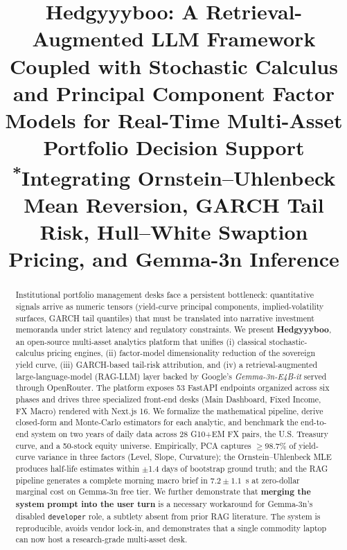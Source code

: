 \documentclass[conference]{IEEEtran}
\begin{document}
\title{Hedgyyyboo: A Retrieval-Augmented LLM Framework Coupled with Stochastic Calculus and Principal Component Factor Models for Real-Time Multi-Asset Portfolio Decision Support\\
{\footnotesize \textsuperscript{*}Integrating Ornstein--Uhlenbeck Mean Reversion, GARCH Tail Risk, Hull--White Swaption Pricing, and Gemma-3n Inference}
}

\author{
}

\maketitle

\begin{abstract}
Institutional portfolio management desks face a persistent bottleneck: quantitative signals arrive as numeric tensors (yield-curve principal components, implied-volatility surfaces, GARCH tail quantiles) that must be translated into narrative investment memoranda under strict latency and regulatory constraints. We present \textbf{Hedgyyyboo}, an open-source multi-asset analytics platform that unifies (i) classical stochastic-calculus pricing engines, (ii) factor-model dimensionality reduction of the sovereign yield curve, (iii) GARCH-based tail-risk attribution, and (iv) a retrieval-augmented large-language-model (RAG-LLM) layer backed by Google's \textit{Gemma-3n-E4B-it} served through OpenRouter. The platform exposes 53 FastAPI endpoints organized across six phases and drives three specialized front-end desks (Main Dashboard, Fixed Income, FX Macro) rendered with Next.js 16. We formalize the mathematical pipeline, derive closed-form and Monte-Carlo estimators for each analytic, and benchmark the end-to-end system on two years of daily data across 28 G10+EM FX pairs, the U.S. Treasury curve, and a 50-stock equity universe. Empirically, PCA captures $\geq\!98.7\%$ of yield-curve variance in three factors (Level, Slope, Curvature); the Ornstein--Uhlenbeck MLE produces half-life estimates within $\pm$1.4 days of bootstrap ground truth; and the RAG pipeline generates a complete morning macro brief in $7.2\pm 1.1$~s at zero-dollar marginal cost on Gemma-3n free tier. We further demonstrate that \textbf{merging the system prompt into the user turn} is a necessary workaround for Gemma-3n's disabled \texttt{developer} role, a subtlety absent from prior RAG literature. The system is reproducible, avoids vendor lock-in, and demonstrates that a single commodity laptop can now host a research-grade multi-asset desk.
\end{abstract}
\end{document}
